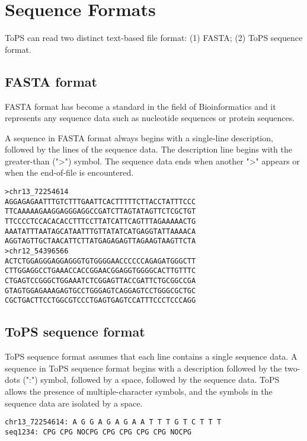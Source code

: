 \chapter{Sequence Formats}


ToPS can read two distinct text-based file format: (1) FASTA; (2) ToPS sequence format.  

\section {FASTA format}

FASTA format has become a standard in the field of Bioinformatics and it represents any sequence data such as  nucleotide sequences or protein sequences.

A sequence in FASTA format always begins with a single-line description, followed by the lines of the sequence data.  The description line begins with the greater-than (">") symbol. The sequence data ends when another ">" appears or when the end-of-file is encountered. 

\vspace{1em}


\begin{Verbatim}
>chr13_72254614
AGGAGAGAATTTGTCTTTGAATTCACTTTTTCTTACCTATTTCCC
TTCAAAAAGAAGGAGGGAGGCCGATCTTAGTATAGTTCTCGCTGT
TTCCCCTCCACACACCTTTCCTTATCATTCAGTTTAGAAAAACTG
AAATATTTAATAGCATAATTTGTTATATCATGAGGTATTAAAACA
AGGTAGTTGCTAACATTCTTATGAGAGAGTTAGAAGTAAGTTCTA
>chr12_54396566
ACTCTGGAGGGAGGAGGGTGTGGGGAACCCCCCAGAGATGGGCTT
CTTGGAGGCCTGAAACCACCGGAACGGAGGTGGGGCACTTGTTTC
CTGAGTCCGGGCTGGAAATCTCGGAGTTACCGATTCTGCGGCCGA
GTAGTGGAGAAAGAGTGCCTGGGAGTCAGGAGTCCTGGGCGCTGC
CGCTGACTTCCTGGCGTCCCTGAGTGAGTCCATTTCCCTCCCAGG
\end{Verbatim}

\section{ToPS sequence format}

ToPS sequence format assumes that each line contains a single sequence data. 
A sequence in ToPS sequence format begins with a description followed by the two-dots (":") symbol, followed by a space, followed by the sequence data. ToPS allows the presence of multiple-character symbols, and the symbols in the sequence data are isolated by a space. 

\vspace{1em}

\begin{Verbatim}
chr13_72254614: A G G A G A G A A T T T G T C T T T
seq1234: CPG CPG NOCPG CPG CPG CPG CPG NOCPG 
\end{Verbatim}



